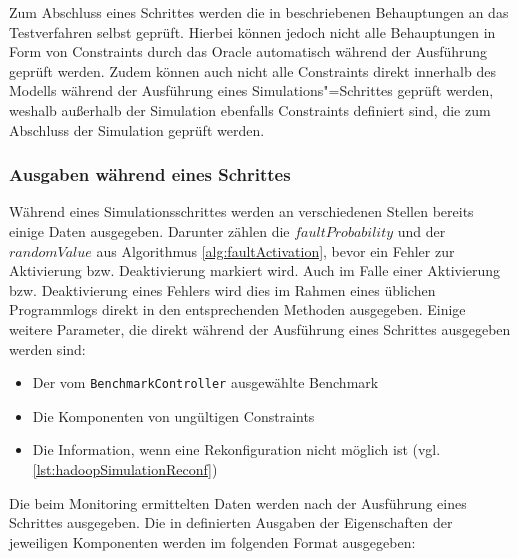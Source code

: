 Zum Abschluss eines Schrittes werden die in  beschriebenen Behauptungen an das Testverfahren selbst geprüft.
Hierbei können jedoch nicht alle Behauptungen in Form von Constraints durch das Oracle automatisch während der Ausführung geprüft werden.
Zudem können auch nicht alle Constraints direkt innerhalb des Modells während der Ausführung eines Simulations"=Schrittes geprüft werden, weshalb außerhalb der Simulation ebenfalls Constraints definiert sind, die zum Abschluss der Simulation geprüft werden.

\subsubsection{Ausgaben während eines Schrittes}
\label{sec:simulationStepOutput}

Während eines Simulationsschrittes werden an verschiedenen Stellen bereits einige Daten ausgegeben.
Darunter zählen \zB die $faultProbability$ und der $randomValue$ aus Algorithmus \ref{alg:faultActivation}, bevor ein Fehler zur Aktivierung bzw. Deaktivierung markiert wird.
Auch im Falle einer Aktivierung bzw. Deaktivierung eines Fehlers wird dies im Rahmen eines üblichen Programmlogs direkt in den entsprechenden Methoden ausgegeben.
Einige weitere Parameter, die direkt während der Ausführung eines Schrittes ausgegeben werden sind:

\begin{itemize}
    \item Der vom \texttt{BenchmarkController} ausgewählte Benchmark
    \item Die Komponenten von ungültigen Constraints
    \item Die Information, wenn eine Rekonfiguration nicht möglich ist (vgl. \autoref{lst:hadoopSimulationReconf})
\end{itemize}

Die beim Monitoring ermittelten Daten werden nach der Ausführung eines Schrittes ausgegeben.
Die in  definierten Ausgaben der Eigenschaften der jeweiligen Komponenten werden im folgenden Format ausgegeben:

